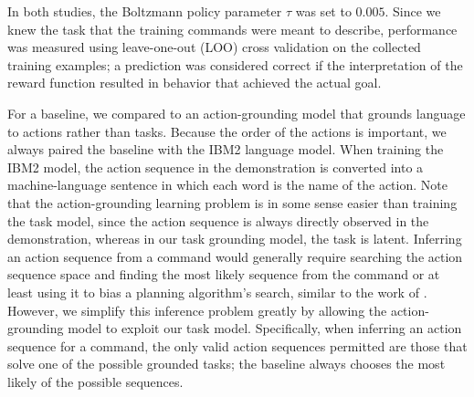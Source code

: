 \documentclass[conference]{IEEEtran}
\begin{document}

In both studies, the Boltzmann policy parameter $\tau$ was set to $0.005$. Since we knew the task that the training commands were meant to describe, performance was measured using leave-one-out (LOO) cross validation on the collected training examples; a prediction was considered correct if the interpretation of the reward function resulted in behavior that achieved the actual goal. 

For a baseline, we compared to an action-grounding model that grounds language to actions rather than tasks. Because the order of the actions is important, we always paired the baseline with the IBM2 language model. When training the IBM2 model, the action sequence in the demonstration is converted into a machine-language sentence in which each word is the name of the action. Note that the action-grounding learning problem is in some sense easier than training the task model, since the action sequence is always directly observed in the demonstration, whereas in our task grounding model, the task is latent.
Inferring an action sequence from a command would generally require searching the action sequence space and finding the most likely sequence from the command or at least using it to bias a planning algorithm's search, similar to the work of \citet{chen11}. However, we simplify this inference problem greatly by allowing the action-grounding model to exploit our task model. Specifically, when inferring an action sequence for a command, the only valid action sequences permitted are those that solve one of the possible grounded tasks; the baseline always chooses the most likely of the possible sequences.
\end{document}
